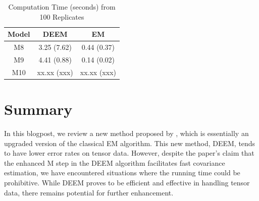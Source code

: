 \documentclass[11pt]{article}
\begin{document}
\begin{table}[H]
    \centering
    \begin{tabular}{|c|cc|}
    \hline
       Model  &  DEEM & EM \\
       \hline
         M8 & 3.25 (7.62) & 0.44 (0.37) \\
         M9 &  4.41 (0.88) & 0.14 (0.02) \\
         M10 &  xx.xx (xxx) & xx.xx (xxx) \\ 
    \hline
    \end{tabular}
    \caption{Computation Time (seconds) from 100 Replicates}
    \label{tab:time2}
\end{table}

\section{Summary}

In this blogpost, we review a new method proposed by \cite{mai2022DEEM}, which is essentially an upgraded version of the classical EM algorithm. This new method, DEEM, tends to have lower error rates on tensor data. However, despite the paper's claim that the enhanced M step in the DEEM algorithm facilitates fast covariance estimation, we have encountered situations where the running time could be prohibitive. While DEEM proves to be efficient and effective in handling tensor data, there remains potential for further enhancement.


\begin{singlespace}
	
	
\end{singlespace}
\end{document}
